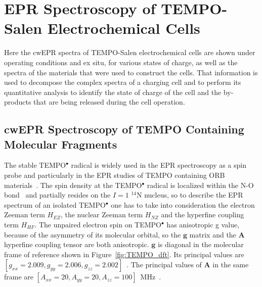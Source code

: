 \chapter{EPR Spectroscopy of TEMPO-Salen Electrochemical Cells}
Here the cwEPR spectra of TEMPO-Salen electrochemical cells are shown under operating conditions and ex situ, for various states of charge, as well as the spectra of the materials that were used to construct the cells.
That information is used to decompose the complex spectra of a charging cell and to perform its quantitative analysis to identify the state of charge of the cell and the by-products that are being released during the cell operation.

\section{cwEPR Spectroscopy of TEMPO Containing Molecular Fragments}
The stable TEMPO$^\bullet$ radical is widely used in the EPR spectroscopy as a spin probe and particularly in the EPR studies of TEMPO containing ORB materials~\cite{nakahara2002_cpl, nishide2004_electact, bahaceci2013_jpowersources, aydin2015_jsoistatelect, khodeir2019_softmatter, Zhang2018}. The spin density at the TEMPO$^\bullet$ radical is localized within the N-O bond~\cite{Owenius2001} and partially resides on the $I=1$ $^{14}$N nucleus, so to describe the EPR spectrum of an isolated TEMPO$^\bullet$ one has to take into consideration the electron Zeeman term $H_{EZ}$, the nuclear Zeeman term $H_{NZ}$ and the hyperfine coupling term $H_{HF}$. The unpaired electron spin on TEMPO$^\bullet$ has anisotropic g value, because of the asymmetry of its molecular orbital, so the $\textbf{g}$ matrix and the $\textbf{A}$ hyperfine coupling tensor are both anisotropic. $\textbf{g}$ is diagonal in the molecular frame of reference shown in Figure~\ref{fig:TEMPO_dft}. Its principal values are $\left[g_{xx}=2.009,g_{yy}=2.006,g_{zz}=2.002\right]$~\cite{Liu_2008,Bordignon2017}. The principal values of $\textbf{A}$ in the same frame are $\left[A_{xx}=20,A_{yy}=20,A_{zz}=100\right]$~MHz~\cite{Liu_2008,Bordignon2017}.


